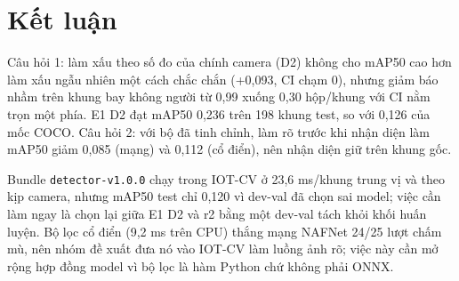 \section{Kết luận}\label{sec:ket-luan}

Câu hỏi 1: làm xấu theo số đo của chính camera (D2) không cho mAP50 cao hơn làm xấu ngẫu nhiên một cách chắc chắn (+0,093, CI chạm 0), nhưng giảm báo nhầm trên khung bay không người từ 0,99 xuống 0,30 hộp/khung với CI nằm trọn một phía. E1 D2 đạt mAP50 0,236 trên 198 khung test, so với 0,126 của mốc COCO. Câu hỏi 2: với bộ đã tinh chỉnh, làm rõ trước khi nhận diện làm mAP50 giảm 0,085 (mạng) và 0,112 (cổ điển), nên nhận diện giữ trên khung gốc.

Bundle \texttt{detector-v1.0.0} chạy trong IOT-CV ở 23,6 ms/khung trung vị và theo kịp camera, nhưng mAP50 test chỉ 0,120 vì dev-val đã chọn sai model; việc cần làm ngay là chọn lại giữa E1 D2 và r2 bằng một dev-val tách khỏi khối huấn luyện. Bộ lọc cổ điển (9,2 ms trên CPU) thắng mạng NAFNet 24/25 lượt chấm mù, nên nhóm đề xuất đưa nó vào IOT-CV làm luồng ảnh rõ; việc này cần mở rộng hợp đồng model vì bộ lọc là hàm Python chứ không phải ONNX.

